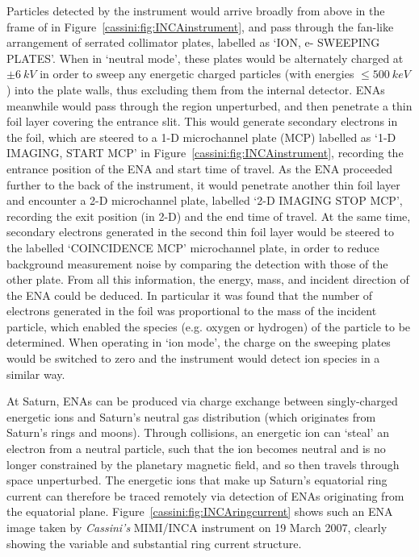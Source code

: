 Particles detected by the instrument would arrive broadly from above in the frame of  in Figure~\ref{cassini:fig:INCAinstrument}, and pass through the fan-like arrangement of serrated collimator plates, labelled as `ION, e- SWEEPING PLATES'. When in `neutral mode', these plates would be alternately charged at $\pm\SI{6}{kV}$ in order to sweep any energetic charged particles (with energies $\leq \SI{500}{keV}$) into the plate walls, thus excluding them from the internal detector. ENAs meanwhile would pass through the region unperturbed, and then penetrate a thin foil layer covering  the entrance slit. This would generate secondary electrons in the foil, which are steered to a 1-D microchannel plate (MCP) labelled as `1-D IMAGING, START MCP' in  Figure~\ref{cassini:fig:INCAinstrument}, recording the entrance position of the ENA and start time of travel. As the ENA proceeded further to the back of the instrument, it would penetrate another thin foil layer and  encounter a 2-D microchannel plate, labelled `2-D IMAGING STOP MCP', recording the exit position (in 2-D) and the end time of travel. At the same time, secondary electrons generated in the second thin foil layer would be steered to the labelled `COINCIDENCE MCP' microchannel plate, in order to reduce background measurement noise by comparing the detection with those of the other plate. From all this information, the energy, mass, and incident direction of the ENA could be deduced. In particular it was found that the number of electrons generated in the foil was proportional to the mass of  the incident particle, which enabled the species (e.g. oxygen or hydrogen) of the particle to be determined. When operating in `ion mode', the  charge on the sweeping plates would be switched to zero and the instrument would detect ion species in a similar way.

At Saturn, ENAs can be produced via charge exchange between singly-charged energetic ions and Saturn's neutral gas distribution (which originates from Saturn's rings and moons). Through collisions, an energetic ion can `steal' an electron from a neutral particle, such that the ion becomes neutral and is no longer constrained by the planetary magnetic field, and so then travels through space unperturbed. The energetic ions that make up Saturn's equatorial ring current can therefore be traced remotely via detection of ENAs originating from the equatorial plane. Figure~\ref{cassini:fig:INCAringcurrent} shows such an ENA image taken by \textit{Cassini's} MIMI/INCA instrument  on 19 March 2007, clearly showing the variable and substantial ring current structure. 

